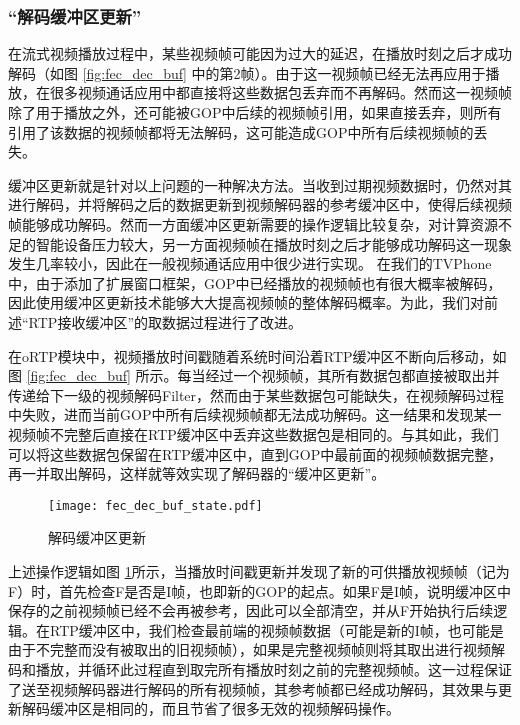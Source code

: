     \subsubsection{``解码缓冲区更新''}
    在流式视频播放过程中，某些视频帧可能因为过大的延迟，在播放时刻之后才成功解码（如图 \ref{fig:fec_dec_buf} 中的第2帧）。由于这一视频帧已经无法再应用于播放，在很多视频通话应用中都直接将这些数据包丢弃而不再解码。然而这一视频帧除了用于播放之外，还可能被GOP中后续的视频帧引用，如果直接丢弃，则所有引用了该数据的视频帧都将无法解码，这可能造成GOP中所有后续视频帧的丢失。

    缓冲区更新就是针对以上问题的一种解决方法。当收到过期视频数据时，仍然对其进行解码，并将解码之后的数据更新到视频解码器的参考缓冲区中，使得后续视频帧能够成功解码。然而一方面缓冲区更新需要的操作逻辑比较复杂，对计算资源不足的智能设备压力较大，另一方面视频帧在播放时刻之后才能够成功解码这一现象发生几率较小，因此在一般视频通话应用中很少进行实现。
    在我们的TVPhone中，由于添加了扩展窗口框架，GOP中已经播放的视频帧也有很大概率被解码，因此使用缓冲区更新技术能够大大提高视频帧的整体解码概率。为此，我们对前述``RTP接收缓冲区''的取数据过程进行了改进。

    在oRTP模块中，视频播放时间戳随着系统时间沿着RTP缓冲区不断向后移动，如图 \ref{fig:fec_dec_buf} 所示。每当经过一个视频帧，其所有数据包都直接被取出并传递给下一级的视频解码Filter，然而由于某些数据包可能缺失，在视频解码过程中失败，进而当前GOP中所有后续视频帧都无法成功解码。这一结果和发现某一视频帧不完整后直接在RTP缓冲区中丢弃这些数据包是相同的。与其如此，我们可以将这些数据包保留在RTP缓冲区中，直到GOP中最前面的视频帧数据完整，再一并取出解码，这样就等效实现了解码器的``缓冲区更新''。

    \begin{figure}[htbp]
      \centering
      \texttt{[image: fec\_dec\_buf\_state.pdf]}
      \caption{解码缓冲区更新}
      \label{fig:fec_dec_buf_state}
    \end{figure}

    上述操作逻辑如图 \ref{fig:fec_dec_buf_state}所示，当播放时间戳更新并发现了新的可供播放视频帧（记为F）时，首先检查F是否是I帧，也即新的GOP的起点。如果F是I帧，说明缓冲区中保存的之前视频帧已经不会再被参考，因此可以全部清空，并从F开始执行后续逻辑。在RTP缓冲区中，我们检查最前端的视频帧数据（可能是新的I帧，也可能是由于不完整而没有被取出的旧视频帧），如果是完整视频帧则将其取出进行视频解码和播放，并循环此过程直到取完所有播放时刻之前的完整视频帧。这一过程保证了送至视频解码器进行解码的所有视频帧，其参考帧都已经成功解码，其效果与更新解码缓冲区是相同的，而且节省了很多无效的视频解码操作。

